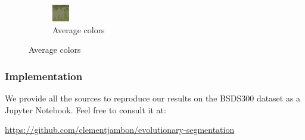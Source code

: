 \documentclass{beamer}
\begin{document}
\begin{frame}
\begin{figure}
\begin{subfigure}[b]{0.16\textwidth}
            \includegraphics[width=\textwidth]{../figures/dino/tile_2/253027_avg.png}
            \caption{Average colors}
        \end{subfigure}
           \label{fig:results-dino-tile2}
    \end{figure}
\end{frame}

\begin{frame}
    \frametitle{Implementation}
    We provide all the sources to reproduce our results on the BSDS300 \cite{bsds300} dataset as a Jupyter Notebook. Feel free to consult it at:
    \begin{center}
        \url{https://github.com/clementjambon/evolutionary-segmentation}
    \end{center}
\end{frame}

\begin{frame}[shrink=30]

  
\end{frame}
  
\end{document}
